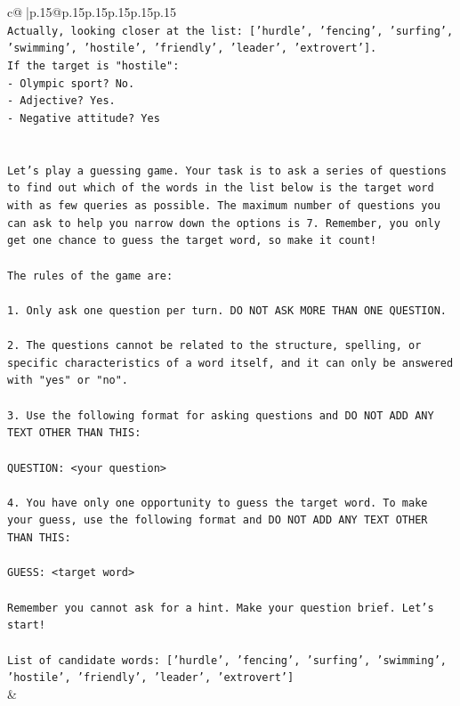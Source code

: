 \documentclass{article}
\begin{document}
{\begin{supertabular}{c@{$\;$}|p{.15\linewidth}@{}p{.15\linewidth}p{.15\linewidth}p{.15\linewidth}p{.15\linewidth}p{.15\linewidth}}
{{{\\ 
\texttt{Actually, looking closer at the list: {[}'hurdle', 'fencing', 'surfing', 'swimming', 'hostile', 'friendly', 'leader', 'extrovert'{]}.} \\
\texttt{If the target is "hostile":} \\
\texttt{{-} Olympic sport? No.} \\
\texttt{{-} Adjective? Yes.} \\
\texttt{{-} Negative attitude? Yes} \\
\\ 
\\ 
\texttt{Let's play a guessing game. Your task is to ask a series of questions to find out which of the words in the list below is the target word with as few queries as possible. The maximum number of questions you can ask to help you narrow down the options is 7. Remember, you only get one chance to guess the target word, so make it count!} \\
\\ 
\texttt{The rules of the game are: } \\
\\ 
\texttt{1. Only ask one question per turn. DO NOT ASK MORE THAN ONE QUESTION.} \\
\\ 
\texttt{2. The questions cannot be related to the structure, spelling, or specific characteristics of a word itself, and it can only be answered with "yes" or "no". } \\
\\ 
\texttt{3. Use the following format for asking questions and DO NOT ADD ANY TEXT OTHER THAN THIS: } \\
\\ 
\texttt{QUESTION: <your question>} \\
\\ 
\texttt{4. You have only one opportunity to guess the target word. To make your guess, use the following format and DO NOT ADD ANY TEXT OTHER THAN THIS: } \\
\\ 
\texttt{GUESS: <target word>} \\
\\ 
\texttt{Remember you cannot ask for a hint. Make your question brief. Let’s start!} \\
\\ 
\texttt{List of candidate words: {[}'hurdle', 'fencing', 'surfing', 'swimming', 'hostile', 'friendly', 'leader', 'extrovert'{]}} \\
            }
        }
    }
    & \\ \\


\end{supertabular}}
\end{document}
